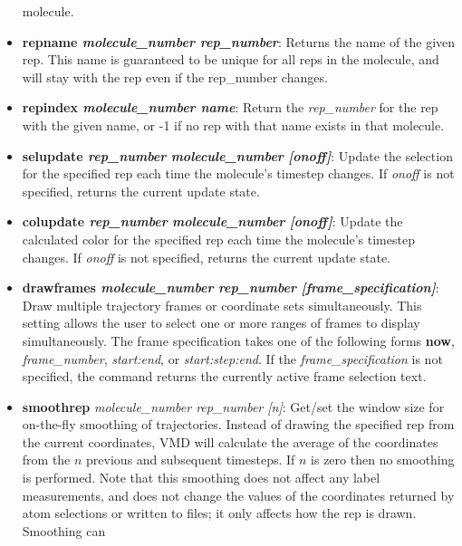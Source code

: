 \begin{itemize}
molecule.
    \item {\bf  repname {\it molecule\_number rep\_number}}:
      Returns the name of the given rep.  This name is
      guaranteed to be unique for all reps in the molecule, and will stay with
      the rep even if the rep\_number changes.  
    \item {\bf repindex {\it molecule\_number name}}: Return the 
      {\it rep\_number} for the rep with the given name, or -1 if no rep with
      that name exists in that molecule.
    \item {\bf selupdate {\it rep\_number} {\it molecule\_number} 
          {\it [onoff]}}: Update the selection for the specified rep each
            time the molecule's timestep changes.  If {\it onoff} is not 
            specified, returns the current update state.
    \item {\bf colupdate {\it rep\_number} {\it molecule\_number} 
          {\it [onoff]}}: Update the calculated color for the specified rep 
          each time the molecule's timestep changes.  If {\it onoff} is not 
          specified, returns the current update state.
    \item {\bf drawframes {\it molecule\_number} {\it rep\_number} {\it [frame\_specification]}}:
           Draw multiple trajectory frames or coordinate sets simultaneously.
           This setting allows the user to select one or more ranges of frames
           to display simultaneously.  The frame specification takes one of the
           following forms {\bf now}, {\it frame\_number}, {\it start:end}, or
           {\it start:step:end}.  If the {\it frame\_specification} is not 
           specified, the command returns the currently active frame 
           selection text.
    \item {\bf smoothrep} {\it molecule\_number rep\_number [n]}:
    Get/set the window size for on-the-fly smoothing of trajectories.  
    Instead of drawing the specified rep from the current coordinates, VMD
    will calculate the average of the coordinates from the $n$ previous
    and subsequent timesteps.  If $n$ is zero then no smoothing is performed.
    Note that this smoothing does not affect any label measurements, and does
    not change the values of the coordinates returned by atom selections or
    written to files; it only affects how the rep is drawn.  Smoothing can

\end{itemize}

